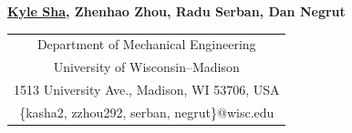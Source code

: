 \documentclass{acmd2026_abstract}
\begin{document}
\begin{center}
\end{center}
\vspace{-6pt}

\begin{center}
\normalsize{
  \bf{
    \underline{Kyle Sha},
    Zhenhao Zhou,
    Radu Serban,
    Dan Negrut}
}
\end{center}
\vspace{-6pt}

\begin{center}
  \begin{tabular}{c}
    Department of Mechanical Engineering             \\
    University of Wisconsin--Madison                 \\
    1513 University Ave., Madison, WI 53706, USA     \\
    \{kasha2, zzhou292, serban, negrut\}@wisc.edu    \\
  \end{tabular}
\end{center}
\vspace{-8pt}

\end{document}
